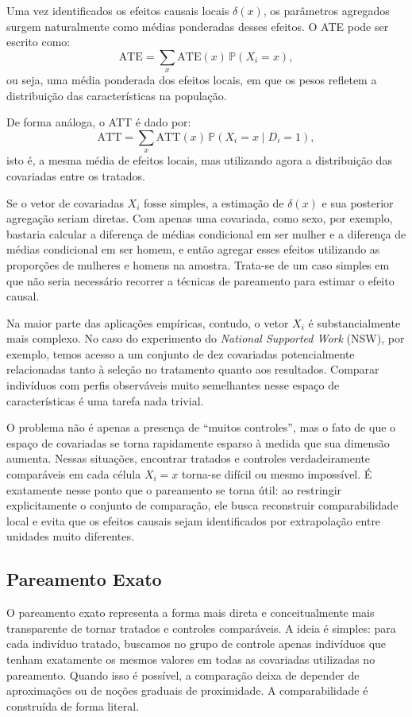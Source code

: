Uma vez identificados os efeitos causais locais $\delta(x)$, os parâmetros agregados surgem naturalmente como médias ponderadas desses efeitos. O ATE pode ser escrito como:
\[
\text{ATE}
=
\sum_x \text{ATE}(x)\,\mathbb{P}(X_i = x),
\]
ou seja, uma média ponderada dos efeitos locais, em que os pesos refletem a distribuição das características na população.

De forma análoga, o ATT é dado por:
\[
\text{ATT}
=
\sum_x \text{ATT}(x)\,\mathbb{P}(X_i = x \mid D_i = 1),
\]
isto é, a mesma média de efeitos locais, mas utilizando agora a distribuição das covariadas entre os tratados.


Se o vetor de covariadas $X_i$ fosse simples, a estimação de $\delta(x)$ e sua posterior agregação seriam diretas. Com apenas uma covariada, como sexo, por exemplo, bastaria calcular a diferença de médias condicional em ser mulher e a diferença de médias condicional em ser homem, e então agregar esses efeitos utilizando as proporções de mulheres e homens na amostra. Trata-se de um caso simples em que não seria necessário recorrer a técnicas de pareamento para estimar o efeito causal.

Na maior parte das aplicações empíricas, contudo, o vetor $X_i$ é substancialmente mais complexo. No caso do experimento do \textit{National Supported Work} (NSW), por exemplo, temos acesso a um conjunto de dez covariadas potencialmente relacionadas tanto à seleção no tratamento quanto aos resultados. Comparar indivíduos com perfis observáveis muito semelhantes nesse espaço de características é uma tarefa nada trivial.

O problema não é apenas a presença de ``muitos controles'', mas o fato de que o espaço de covariadas se torna rapidamente esparso à medida que sua dimensão aumenta. Nessas situações, encontrar tratados e controles verdadeiramente comparáveis em cada célula $X_i = x$ torna-se difícil ou mesmo impossível. É exatamente nesse ponto que o pareamento se torna útil: ao restringir explicitamente o conjunto de comparação, ele busca reconstruir comparabilidade local e evita que os efeitos causais sejam identificados por extrapolação entre unidades muito diferentes.


\subsection{Pareamento Exato}

O pareamento exato representa a forma mais direta e conceitualmente mais transparente de tornar tratados e controles comparáveis. A ideia é simples: para cada indivíduo tratado, buscamos no grupo de controle apenas indivíduos que tenham exatamente os mesmos valores em todas as covariadas utilizadas no pareamento. Quando isso é possível, a comparação deixa de depender de aproximações ou de noções graduais de proximidade. A comparabilidade é construída de forma literal.

